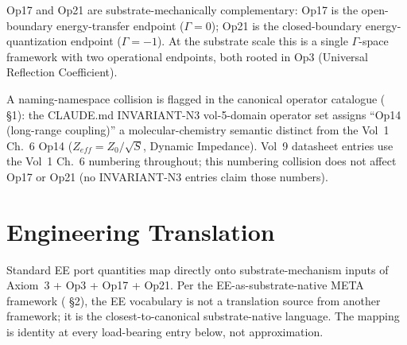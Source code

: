 \noindent
Op17 and Op21 are substrate-mechanically complementary: Op17 is the open-boundary energy-transfer endpoint ($\Gamma = 0$); Op21 is the closed-boundary energy-quantization endpoint ($\Gamma = -1$\gammaundeclared{}). At the substrate scale this is a single $\Gamma$-space framework with two operational endpoints, both rooted in Op3 (Universal Reflection Coefficient).

A naming-namespace collision is flagged in the canonical operator catalogue ( \S 1): the CLAUDE.md INVARIANT-N3 vol-5-domain operator set assigns ``Op14 (long-range coupling)'' a molecular-chemistry semantic distinct from the Vol~1 Ch.~6 Op14 ($Z_{eff} = Z_0/\sqrt{S}$, Dynamic Impedance). Vol~9 datasheet entries use the Vol~1 Ch.~6 numbering throughout; this numbering collision does not affect Op17 or Op21 (no INVARIANT-N3 entries claim those numbers).

\section{Engineering Translation}
\label{sec:vol9_engineering_translation}

Standard EE port quantities map directly onto substrate-mechanism inputs of Axiom~3 + Op3 + Op17 + Op21. Per the EE-as-substrate-native META framework ( \S 2), the EE vocabulary is not a translation source from another framework; it is the closest-to-canonical substrate-native language. The mapping is identity at every load-bearing entry below, not approximation.

